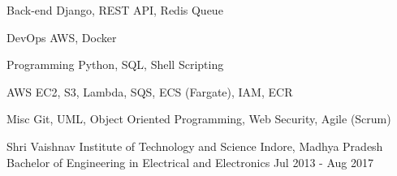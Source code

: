 \documentclass{my_resume}
\begin{document}
	\begin{cvskills}
		\cvskill
		{Back-end} %
		{Django, REST API, Redis Queue} %

		\cvskill
			{DevOps} %
			{AWS, Docker} %

		\cvskill
			{Programming} %
			{Python, SQL, Shell Scripting} %

		\cvskill
		{AWS}
		{EC2, S3, Lambda, SQS, ECS (Fargate), IAM, ECR}

		\cvskill
		{Misc}
		{Git, UML, Object Oriented Programming, Web Security, Agile (Scrum)}
	\end{cvskills}


	\begin{cventries}
		\cventry
			{Shri Vaishnav Institute of Technology and Science} %
			{Indore, Madhya Pradesh} %
			{Bachelor of Engineering in Electrical and Electronics} %
			{Jul 2013 - Aug 2017} %
	\end{cventries}
\end{document}
